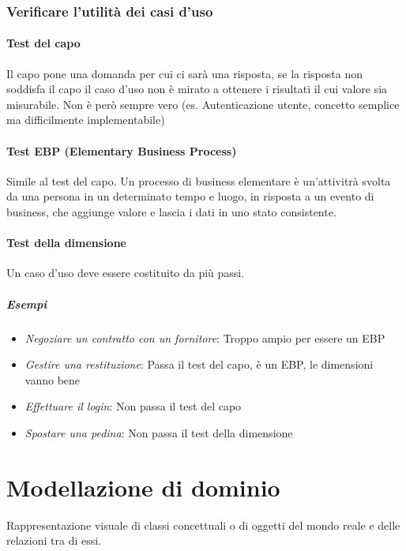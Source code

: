 \documentclass[12pt]{article}
\begin{document}
\subsubsection{Verificare l'utilità dei casi d'uso}
\paragraph{Test del capo} Il capo pone una domanda per cui ci sarà una risposta, se la risposta non soddisfa il capo il caso d'uso non è mirato a ottenere i risultati il cui valore sia misurabile. Non è però sempre vero (es. Autenticazione utente, concetto semplice ma difficilmente implementabile)
\paragraph{Test EBP (Elementary Business Process)} Simile al test del capo. Un processo di business elementare è un'attivitrà svolta da una persona in un determinato tempo e luogo, in risposta a un evento di business, che aggiunge valore e lascia i dati in uno stato consistente.
\paragraph{Test della dimensione} Un caso d'uso deve essere costituito da più passi.
\subparagraph{Esempi}
\begin{itemize}
    \item \textit{Negoziare un contratto con un fornitore}: Troppo ampio per essere un EBP
    \item \textit{Gestire una restituzione}: Passa il test del capo, è un EBP, le dimensioni vanno bene
    \item \textit{Effettuare il login}: Non passa il test del capo
    \item \textit{Spostare una pedina}: Non passa il test della dimensione
\end{itemize} 
\newpage
\section{Modellazione di dominio}
Rappresentazione visuale di classi concettuali o di oggetti del mondo reale e delle relazioni tra di essi.
\end{document}
